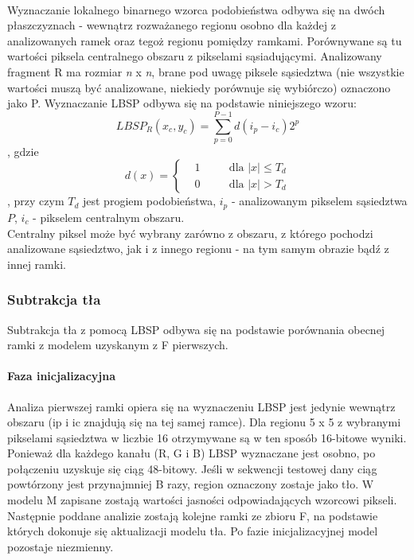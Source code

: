 \paragraph{}
Wyznaczanie lokalnego binarnego wzorca podobieństwa odbywa się na dwóch płaszczyznach - wewnątrz rozważanego regionu osobno dla każdej z analizowanych ramek oraz tegoż regionu pomiędzy ramkami. Porównywane są tu wartości piksela centralnego obszaru z pikselami sąsiadującymi. Analizowany fragment R ma rozmiar \textit{n} x \textit{n}, brane pod uwagę piksele sąsiedztwa (nie wszystkie wartości muszą być analizowane, niekiedy porównuje się wybiórczo) oznaczono jako P. Wyznaczanie LBSP odbywa się na podstawie niniejszego wzoru:
\begin{equation}
LBSP_{R}(x_{c},y_{c}) = 
\sum_{p=0}^{P-1}d(i_{p}-i_{c})2^p
\end{equation},
gdzie
\begin{equation}
d(x)=\left\{
\begin{split}
&1 & \quad &\text{dla $|x|\leq T_{d}$} \\
&0 & \quad &\text{dla $|x|>T_{d}$}
\end{split}
\right.
\end{equation}
, przy czym $T_{d}$ jest progiem podobieństwa, $i_{p}$ - analizowanym pikselem sąsiedztwa $P$, $i_{c}$ - pikselem centralnym obszaru.\\
Centralny piksel może być wybrany zarówno z obszaru, z którego pochodzi analizowane sąsiedztwo, jak i z innego regionu - na tym samym obrazie bądź z innej ramki.
\subsubsection{Subtrakcja tła}
Subtrakcja tła z pomocą LBSP odbywa się na podstawie porównania obecnej ramki z modelem uzyskanym z F pierwszych. 
\paragraph{Faza inicjalizacyjna \\}
Analiza pierwszej ramki opiera się na wyznaczeniu LBSP  jest jedynie wewnątrz obszaru (ip i ic znajdują się na tej samej ramce). Dla regionu 5 x 5 z wybranymi pikselami sąsiedztwa w liczbie 16 otrzymywane są w ten sposób 16-bitowe wyniki. Ponieważ dla każdego kanału (R, G i B) LBSP wyznaczane jest osobno, po połączeniu uzyskuje się ciąg 48-bitowy. Jeśli w sekwencji testowej dany ciąg powtórzony jest przynajmniej B razy, region oznaczony zostaje jako tło. W modelu M zapisane zostają wartości jasności odpowiadających wzorcowi pikseli. Następnie poddane analizie zostają kolejne ramki ze zbioru F, na podstawie których dokonuje się aktualizacji modelu tła. Po fazie inicjalizacyjnej model pozostaje niezmienny.
